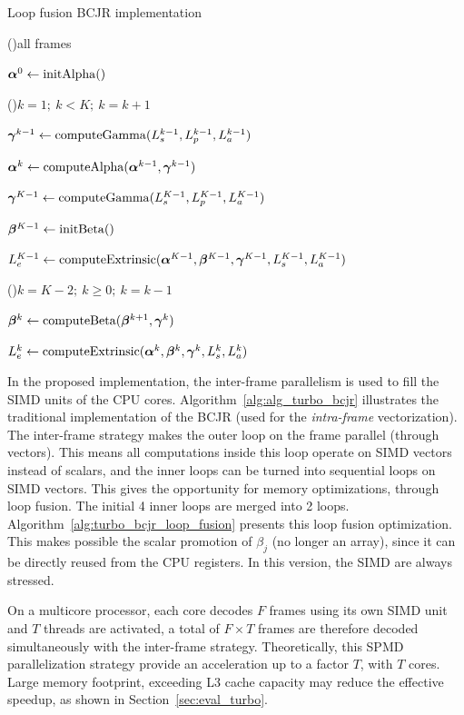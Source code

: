 \begin{algorithm}
  \caption{Loop fusion BCJR implementation}
  \label{alg:turbo_bcjr_loop_fusion}

  \For(){all frames}
  {
    $\boldsymbol{\alpha}^0\gets \operatorname*{initAlpha}()$

    \For(){$k=1;~k<K;~k=k+1$}
    {
      $\boldsymbol{\gamma}^{k-1}\gets \operatorname*{computeGamma}(L_{s}^{k-1}, L_{p}^{k-1}, L_{a}^{k-1})$

      $\boldsymbol{\alpha}^k\gets \operatorname*{computeAlpha}(\boldsymbol{\alpha}^{k-1}, \boldsymbol{\gamma}^{k-1})$
    }

    $\boldsymbol{\gamma}^{K-1}\gets \operatorname*{computeGamma}(L_{s}^{K-1}, L_{p}^{K-1}, L_{a}^{K-1})$

    $\boldsymbol{\beta}^{K-1}\gets \operatorname*{initBeta}()$

    $L_e^{K-1}\gets \operatorname*{computeExtrinsic}(\boldsymbol{\alpha}^{K-1}, \boldsymbol{\beta}^{K-1}, \boldsymbol{\gamma}^{K-1}, L_{s}^{K-1}, L_{a}^{K-1})$

    \For(){$k=K-2;~k \geq 0;~k=k-1$}
    {
      $\boldsymbol{\beta}^k\gets \operatorname*{computeBeta}(\boldsymbol{\beta}^{k+1}, \boldsymbol{\gamma}^{k})$

      $L_e^{k}\gets \operatorname*{computeExtrinsic}(\boldsymbol{\alpha}^{k}, \boldsymbol{\beta}^k, \boldsymbol{\gamma}^{k}, L_{s}^{k}, L_{a}^{k})$
    }
  }
\end{algorithm}

In the proposed implementation, the inter-frame parallelism is used to fill the
SIMD units of the CPU cores. Algorithm~\ref{alg:alg_turbo_bcjr} illustrates the
traditional implementation of the BCJR (used for the \emph{intra-frame}
vectorization). The inter-frame strategy makes the outer loop on the frame
parallel (through vectors). This means all computations inside this loop operate
on SIMD vectors instead of scalars, and the inner loops can be turned into
sequential loops on SIMD vectors. This gives the opportunity for memory
optimizations, through loop fusion. The initial 4 inner loops are merged into 2
loops. Algorithm~\ref{alg:turbo_bcjr_loop_fusion} presents this loop fusion
optimization. This makes possible the scalar promotion of $\beta_j$ (no longer
an array), since it can be directly reused from the CPU registers. In this
version, the SIMD are always stressed.

On a multicore processor, each core decodes $F$ frames using its own SIMD unit
and $T$ threads are activated, a total of $F\times T$ frames are therefore
decoded simultaneously with the inter-frame strategy. Theoretically, this SPMD
parallelization strategy provide an acceleration up to a factor $T$, with $T$
cores. Large memory footprint, exceeding L3 cache capacity may reduce the
effective speedup, as shown in Section~\ref{sec:eval_turbo}.

